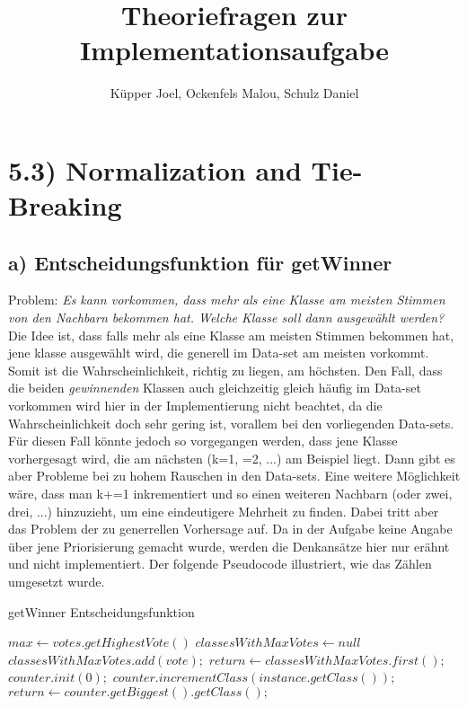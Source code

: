 \documentclass[11pt, oneside]{article}
\title{Theoriefragen zur Implementationsaufgabe}
\author{K\"upper Joel,
Ockenfels Malou,
Schulz Daniel}
\begin{document}
\maketitle

\section{5.3) Normalization and Tie-Breaking}
\subsection{a) Entscheidungsfunktion für getWinner}
Problem: \textit{Es kann vorkommen, dass mehr als eine Klasse am meisten Stimmen von den Nachbarn bekommen hat. Welche Klasse soll dann ausgewählt werden?}\newline
Die Idee ist, dass falls mehr als eine Klasse am meisten Stimmen bekommen hat, jene klasse ausgewählt wird, die generell im Data-set am meisten vorkommt. 
Somit ist die Wahrscheinlichkeit, richtig zu liegen, am höchsten.
Den Fall, dass die beiden \emph{gewinnenden} Klassen auch gleichzeitig gleich häufig im Data-set vorkommen wird hier in der Implementierung nicht beachtet, da die Wahrscheinlichkeit doch sehr gering ist, vorallem bei den vorliegenden Data-sets.\newline
Für diesen Fall könnte jedoch so vorgegangen werden, dass jene Klasse vorhergesagt wird, die am nächsten (k=1, =2, ...) am Beispiel liegt.
Dann gibt es aber Probleme bei zu hohem Rauschen in den Data-sets.\newline
Eine weitere Möglichkeit wäre, dass man k+=1 inkrementiert und so einen weiteren Nachbarn (oder zwei, drei, ...) hinzuzieht, um eine eindeutigere Mehrheit zu finden. 
Dabei tritt aber das Problem der zu generrellen Vorhersage auf. 
Da in der Aufgabe keine Angabe über jene Priorisierung gemacht wurde, werden die Denkansätze hier nur erähnt und nicht implementiert.\newline
Der folgende Pseudocode illustriert, wie das Zählen umgesetzt wurde.

\begin{algorithm}[H]
\caption{getWinner Entscheidungsfunktion}\label{euclid}
\begin{algorithmic}[1]
\State $max \gets votes.getHighestVote()$
\State $classesWithMaxVotes \gets null$
	\State $classesWithMaxVotes.add(vote);$
\EndIf
\EndFor
{}
	\State $return \gets classesWithMaxVotes.first();$
\Else
	\State $counter.init(0);$
			\State $counter.incrementClass(instance.getClass());$
		\EndIf
	\EndFor
\EndIf
\State $return \gets counter.getBiggest().getClass();$

\EndFunction
\end{algorithmic}
\end{algorithm}
\pagebreak
\end{document}
